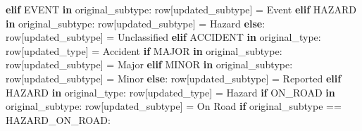 \documentclass[
  letterpaper,
  DIV=11,
  numbers=noendperiod]{scrartcl}
\newenvironment{Shaded}{\begin{snugshade}}{\end{snugshade}}
\newcommand{\ControlFlowTok}[1]{\textcolor[rgb]{0.00,0.23,0.31}{\textbf{#1}}}
\newcommand{\KeywordTok}[1]{\textcolor[rgb]{0.00,0.23,0.31}{\textbf{#1}}}
\newcommand{\NormalTok}[1]{\textcolor[rgb]{0.00,0.23,0.31}{#1}}
\newcommand{\OperatorTok}[1]{\textcolor[rgb]{0.37,0.37,0.37}{#1}}
\newcommand{\StringTok}[1]{\textcolor[rgb]{0.13,0.47,0.30}{#1}}
\begin{document}
\begin{Shaded}
\begin{Highlighting}[]
        \ControlFlowTok{elif} \StringTok{\textquotesingle{}EVENT\textquotesingle{}} \KeywordTok{in}\NormalTok{ original\_subtype:}
\NormalTok{            row[}\StringTok{\textquotesingle{}updated\_subtype\textquotesingle{}}\NormalTok{] }\OperatorTok{=} \StringTok{\textquotesingle{}Event\textquotesingle{}}
        \ControlFlowTok{elif} \StringTok{\textquotesingle{}HAZARD\textquotesingle{}} \KeywordTok{in}\NormalTok{ original\_subtype:}
\NormalTok{            row[}\StringTok{\textquotesingle{}updated\_subtype\textquotesingle{}}\NormalTok{] }\OperatorTok{=} \StringTok{\textquotesingle{}Hazard\textquotesingle{}}
        \ControlFlowTok{else}\NormalTok{:}
\NormalTok{            row[}\StringTok{\textquotesingle{}updated\_subtype\textquotesingle{}}\NormalTok{] }\OperatorTok{=} \StringTok{\textquotesingle{}Unclassified\textquotesingle{}}
    \ControlFlowTok{elif} \StringTok{\textquotesingle{}ACCIDENT\textquotesingle{}} \KeywordTok{in}\NormalTok{ original\_type:}
\NormalTok{        row[}\StringTok{\textquotesingle{}updated\_type\textquotesingle{}}\NormalTok{] }\OperatorTok{=} \StringTok{\textquotesingle{}Accident\textquotesingle{}}
        \ControlFlowTok{if} \StringTok{\textquotesingle{}MAJOR\textquotesingle{}} \KeywordTok{in}\NormalTok{ original\_subtype:}
\NormalTok{            row[}\StringTok{\textquotesingle{}updated\_subtype\textquotesingle{}}\NormalTok{] }\OperatorTok{=} \StringTok{\textquotesingle{}Major\textquotesingle{}}
        \ControlFlowTok{elif} \StringTok{\textquotesingle{}MINOR\textquotesingle{}} \KeywordTok{in}\NormalTok{ original\_subtype:}
\NormalTok{            row[}\StringTok{\textquotesingle{}updated\_subtype\textquotesingle{}}\NormalTok{] }\OperatorTok{=} \StringTok{\textquotesingle{}Minor\textquotesingle{}}
        \ControlFlowTok{else}\NormalTok{:}
\NormalTok{            row[}\StringTok{\textquotesingle{}updated\_subtype\textquotesingle{}}\NormalTok{] }\OperatorTok{=} \StringTok{\textquotesingle{}Reported\textquotesingle{}}
    \ControlFlowTok{elif} \StringTok{\textquotesingle{}HAZARD\textquotesingle{}} \KeywordTok{in}\NormalTok{ original\_type:}
\NormalTok{        row[}\StringTok{\textquotesingle{}updated\_type\textquotesingle{}}\NormalTok{] }\OperatorTok{=} \StringTok{\textquotesingle{}Hazard\textquotesingle{}}
        \ControlFlowTok{if} \StringTok{\textquotesingle{}ON\_ROAD\textquotesingle{}} \KeywordTok{in}\NormalTok{ original\_subtype:}
\NormalTok{            row[}\StringTok{\textquotesingle{}updated\_subtype\textquotesingle{}}\NormalTok{] }\OperatorTok{=} \StringTok{\textquotesingle{}On Road\textquotesingle{}}
            \ControlFlowTok{if}\NormalTok{ original\_subtype }\OperatorTok{==} \StringTok{\textquotesingle{}HAZARD\_ON\_ROAD\textquotesingle{}}\NormalTok{:}

\end{Highlighting}
\end{Shaded}
\end{document}
